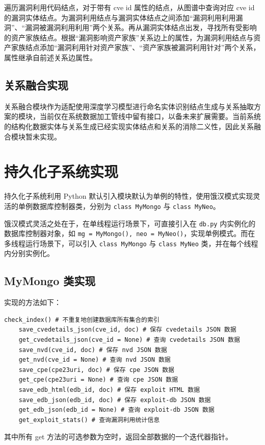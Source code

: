 \documentclass[a4paper,AutoFakeBold,oneside,12pt]{book}
\begin{document}
遍历漏洞利用代码结点，对于带有 cve id 属性的结点，从图谱中查询对应 cve id 的漏洞实体结点。为漏洞利用结点与漏洞实体结点之间添加“漏洞利用利用漏洞”、“漏洞被漏洞利用利用”两个关系。再从漏洞实体结点出发，寻找所有受影响的资产家族结点。根据“漏洞影响资产家族”关系边上的属性，为漏洞利用结点与资产家族结点添加“漏洞利用针对资产家族”、“资产家族被漏洞利用针对”两个关系，属性继承自前述关系边属性。

\subsection{关系融合实现}

关系融合模块作为适配使用深度学习模型进行命名实体识别结点生成与关系抽取方案的模块，当前仅在系统数据加工管线中留有接口，以备未来扩展需要。当前系统的结构化数据实体与关系生成已经实现实体结点和关系的消除二义性，因此关系融合模块暂未实现。

\section{持久化子系统实现}

持久化子系统利用 Python 默认引入模块默认为单例的特性，使用饿汉模式\cite{}实现灵活的单例数据库控制器类，分别为 \lstinline|class MyMongo| 与 \lstinline|class MyNeo|。

饿汉模式灵活之处在于，在单线程运行场景下，可直接引入在 \lstinline|db.py| 内实例化的数据库控制器对象，如 \lstinline|mg = MyMongo(), neo = MyNeo()|，实现单例模式。而在多线程运行场景下，可以引入 \lstinline|class MyMongo| 与 \lstinline|class MyNeo| 类，并在每个线程内分别实例化。

\subsection{MyMongo 类实现}

实现的方法如下：
\begin{lstlisting}[style=lgeneral]
	check_index() # 不重复地创建数据库所有集合的索引
	save_cvedetails_json(cve_id, doc) # 保存 cvedetails JSON 数据
	get_cvedetails_json(cve_id = None) # 查询 cvedetails JSON 数据
	save_nvd(cve_id, doc) # 保存 nvd JSON 数据
	get_nvd(cve_id = None) # 查询 nvd JSON 数据
	save_cpe(cpe23uri, doc) # 保存 cpe JSON 数据
	get_cpe(cpe23uri = None) # 查询 cpe JSON 数据
	save_edb_html(edb_id, doc) # 保存 exploit HTML 数据
	save_edb_json(edb_id, doc) # 保存 exploit-db JSON 数据
	get_edb_json(edb_id = None) # 查询 exploit-db JSON 数据
	get_exploit_stats() # 查询漏洞利用统计信息
\end{lstlisting}
其中所有 get 方法的可选参数为空时，返回全部数据的一个迭代器指针。
\end{document}
